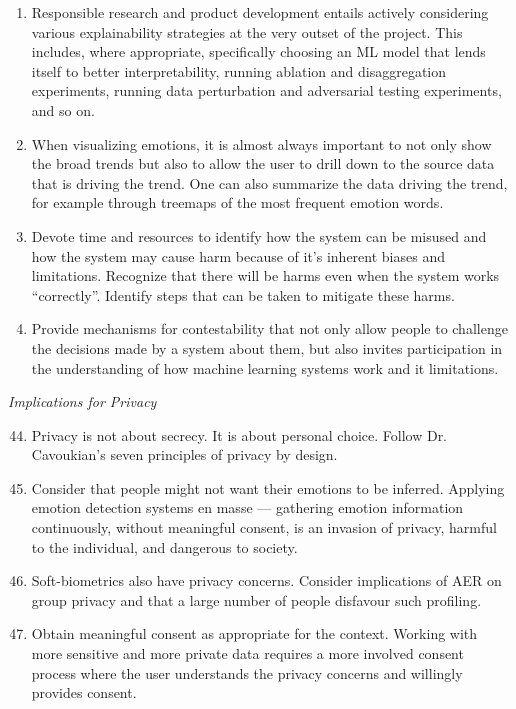\documentclass{clv3}
\begin{document}
{\begin{enumerate}
\item Responsible research and product development entails actively considering various explainability strategies at the very outset of the project. This includes, where appropriate, specifically choosing an ML model that lends itself to better interpretability, running ablation and disaggregation experiments, running data perturbation and adversarial testing experiments, and so on.
\item When visualizing emotions, it is almost always important to not only show the broad trends but also to allow the user to drill down to the source data that is driving the trend. One can also summarize the data driving the trend, for example through treemaps of the most frequent emotion words.
\item Devote time and resources to identify how the system can be misused and how the system may cause harm because of it’s inherent biases and limitations. Recognize that there will be harms even when the system works “correctly”.
Identify steps that can be taken to mitigate these harms.
\item Provide mechanisms for contestability that not only allow people to challenge the decisions made by a system about them, but also invites participation in the understanding of how machine learning systems work and it limitations.
\end{enumerate}
\noindent \textit{Implications for Privacy}
\begin{enumerate}
  \setcounter{enumi}{43}
\item Privacy is not about secrecy. It is about personal choice. Follow Dr. Cavoukian’s seven principles of privacy by design.
\item Consider that people might not want their emotions to be inferred. Applying emotion detection systems en masse --- gathering emotion information continuously, without meaningful consent, is an invasion of privacy, harmful to the individual, and dangerous to society.
\item Soft-biometrics also have privacy concerns. Consider implications of AER on group privacy and that a large number of people disfavour such profiling.
\item Obtain meaningful consent as appropriate for the context. Working with more sensitive and more private data requires a more involved consent process where the user understands the privacy concerns and willingly provides consent.

\end{enumerate}}
\end{document}
